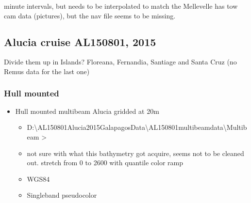 \documentclass[letterpaper,10pt,english]{sphinxmanual}
\begin{document}
 minute intervals, but needs to be interpolated to match the Mellevelle has tow cam data (pictures), but the nav file seems to be missing.


\subsection{Alucia cruise AL150801, 2015}
\label{\detokenize{02_folder_hierarchy:alucia-cruise-al150801-2015}}
\sphinxAtStartPar
Divide them up in Islands? Floreana, Fernandia, Santiage and Santa Cruz (no Remus data for the last one)


\subsubsection{Hull mounted}
\label{\detokenize{02_folder_hierarchy:hull-mounted}}\begin{itemize}
\item {} 
\sphinxAtStartPar
Hull mounted multibeam Alucia \sphinxhyphen{} gridded at 20m
\begin{itemize}
\item {} 
\sphinxAtStartPar
D:\textbackslash{}AL150801\sphinxhyphen{}Alucia\sphinxhyphen{}2015\sphinxhyphen{}Galapagos\sphinxhyphen{}Data\textbackslash{}AL150801\sphinxhyphen{}multibeam\sphinxhyphen{}data\textbackslash{}Multibeam \sphinxhyphen{}\textgreater{}

\item {} 
\sphinxAtStartPar
not sure with what this bathymetry got acquire, seems not to be cleaned out. stretch from 0 to \sphinxhyphen{}2600 with quantile color ramp

\item {} 
\sphinxAtStartPar
WGS84

\item {} 
\sphinxAtStartPar
Singleband pseudocolor

\end{itemize}

\end{itemize}
\end{document}

